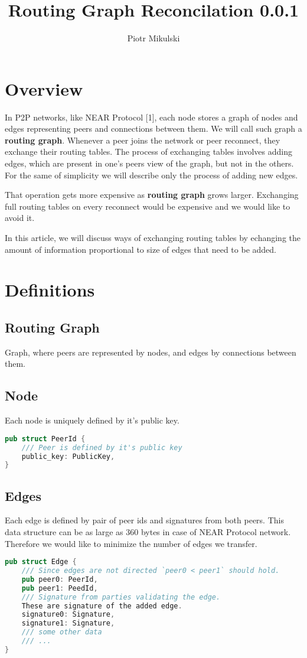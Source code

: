 \documentclass[11pt]{article}
\title{\textbf{Routing Graph Reconcilation 0.0.1}}
\author{Piotr Mikulski}
\date{}
\begin{document}
\maketitle
\thispagestyle{empty}

\section{Overview}
In P2P networks, like NEAR Protocol [1], each node stores a graph of nodes and edges representing peers and connections between them.
We will call such graph a \textbf{routing graph}. Whenever a peer joins the network or peer reconnect, they exchange their routing tables. The process of exchanging tables involves adding edges, which are present in one's peers view of the graph, but not in the others.
For the same of simplicity we will describe only the process of adding new edges.

That operation gets more expensive as \textbf{routing graph} grows larger. Exchanging full routing tables on every reconnect would be expensive and we would like to avoid it.

In this article, we will discuss ways of exchanging routing tables by echanging the amount of information proportional to size of edges that need to be added.

\section{Definitions}
\subsection{Routing Graph}
Graph, where peers are represented by nodes, and edges by connections between them.
\subsection{Node}
Each node is uniquely defined by it's public key.

\begin{lstlisting}[language=Rust]
pub struct PeerId {
    /// Peer is defined by it's public key
    public_key: PublicKey,
}
\end{lstlisting}

\subsection{Edges}
Each edge is defined by pair of peer ids and signatures from both peers.
This data structure can be as large as 360 bytes in case of NEAR Protocol network. Therefore we would like to minimize the number of edges we transfer.
\begin{lstlisting}[language=Rust]
pub struct Edge {
    /// Since edges are not directed `peer0 < peer1` should hold.
    pub peer0: PeerId,
    pub peer1: PeedId,
    /// Signature from parties validating the edge.
    These are signature of the added edge.
    signature0: Signature,
    signature1: Signature,
    /// some other data
    /// ...
}
\end{lstlisting}
\end{document}
